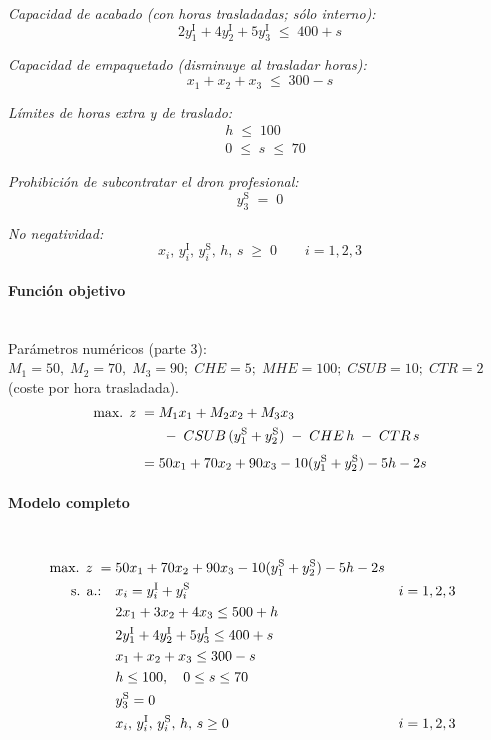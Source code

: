\textit{Capacidad de acabado (con horas trasladadas; sólo interno):}
\begin{equation}
2y_1^{\mathrm{I}} + 4y_2^{\mathrm{I}} + 5y_3^{\mathrm{I}} \;\leq\; 400 + s
\end{equation}

\textit{Capacidad de empaquetado (disminuye al trasladar horas):}
\begin{equation}
x_1 + x_2 + x_3 \;\leq\; 300 - s
\end{equation}

\textit{Límites de horas extra y de traslado:}
\begin{align}
& h \;\leq\; 100 \\
& 0 \;\leq\; s \;\leq\; 70
\end{align}

\textit{Prohibición de subcontratar el dron profesional:}
\begin{equation}
y_3^{\mathrm{S}} \;=\; 0
\end{equation}

\textit{No negatividad:}
\begin{equation}
x_i,\, y_i^{\mathrm{I}},\, y_i^{\mathrm{S}},\, h,\, s \;\geq\; 0 \qquad i=1,2,3
\end{equation}

\paragraph{Función objetivo}\mbox{}\\
Parámetros numéricos (parte 3):
\(
M_1=50,\; M_2=70,\; M_3=90;\;
CHE=5;\; MHE=100;\; CSUB=10;\; CTR=2
\) (coste por hora trasladada).
\begin{align}
\mbox{max. } z \;=\;& M_1x_1 + M_2x_2 + M_3 x_3 \notag\\
&\;-\; CSUB\,(y_1^{\mathrm{S}}+y_2^{\mathrm{S}}) \;-\; CHE\,h \;-\; CTR\,s \notag\\[1mm]
=\;& 50x_1 + 70x_2 + 90x_3 - 10(y_1^{\mathrm{S}}+y_2^{\mathrm{S}}) - 5h - 2s
\end{align}

\paragraph{Modelo completo}\mbox{}\\
\begin{align}
\mbox{max. } z \;=\;& 50x_1 + 70x_2 + 90x_3 - 10(y_1^{\mathrm{S}}+y_2^{\mathrm{S}}) - 5h - 2s \notag\\
\mbox{s. a.:}\quad
& x_i = y_i^{\mathrm{I}} + y_i^{\mathrm{S}} && i=1,2,3 \notag\\
& 2x_1 + 3x_2 + 4x_3 \leq 500 + h \notag\\
& 2y_1^{\mathrm{I}} + 4y_2^{\mathrm{I}} + 5y_3^{\mathrm{I}} \leq 400 + s \notag\\
& x_1 + x_2 + x_3 \leq 300 - s \notag\\
& h \leq 100,\quad 0 \leq s \leq 70 \notag\\
& y_3^{\mathrm{S}} = 0 \notag\\
& x_i,\, y_i^{\mathrm{I}},\, y_i^{\mathrm{S}},\, h,\, s \geq 0 && i=1,2,3 \notag
\end{align}


